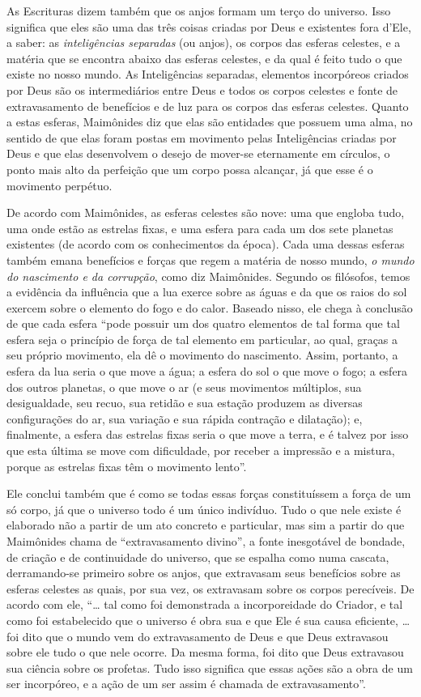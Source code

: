 As Escrituras dizem também que os anjos formam um terço do universo.
Isso significa que eles são uma das três coisas criadas por Deus e
existentes fora d'Ele, a saber: as \emph{inteligências separadas} (ou anjos),
os corpos das esferas celestes, e a matéria que se encontra abaixo das
esferas celestes, e da qual é feito tudo o que existe no nosso mundo. As
Inteligências separadas, elementos incorpóreos criados por Deus são os
intermediários entre Deus e todos os corpos celestes e fonte de
extravasamento de benefícios e de luz para os corpos das esferas
celestes. Quanto a estas esferas, Maimônides diz que elas são entidades
que possuem uma alma, no sentido de que elas foram postas em movimento
pelas Inteligências criadas por Deus e que elas desenvolvem o desejo de
mover-se eternamente em círculos, o ponto mais alto da perfeição que um
corpo possa alcançar, já que esse é o movimento perpétuo.

De acordo com Maimônides, as esferas celestes são nove: uma
que engloba tudo, uma onde estão as estrelas fixas, e uma esfera para
cada um dos sete planetas existentes (de acordo com os conhecimentos da
época). Cada uma dessas esferas também emana benefícios e forças que
regem a matéria de nosso mundo, \emph{o mundo do nascimento e da
corrupção}, como diz Maimônides. Segundo os filósofos, temos a
evidência da influência que a lua exerce sobre as águas e da que os
raios do sol exercem sobre o elemento do fogo e do calor. Baseado
nisso, ele chega à conclusão de que cada esfera ``pode possuir um dos
quatro elementos de tal forma que tal esfera seja o princípio de força
de tal elemento em particular, ao qual, graças a seu próprio movimento,
ela dê o movimento do nascimento. Assim, portanto, a esfera da lua seria
o que move a água; a esfera do sol o que move o fogo; a esfera dos
outros planetas, o que move o ar (e seus movimentos múltiplos, sua
desigualdade, seu recuo, sua retidão e sua estação produzem as diversas
configurações do ar, sua variação e sua rápida contração e dilatação);
e, finalmente, a esfera das estrelas fixas seria o que move a terra, e é
talvez por isso que esta última se move com dificuldade, por receber a
impressão e a mistura, porque as estrelas fixas têm o movimento
lento''.

Ele conclui também que é como se todas essas forças constituíssem a
força de um só corpo, já que o universo todo é um único indivíduo. Tudo
o que nele existe é elaborado não a partir de um ato concreto e
particular, mas sim a partir do que Maimônides chama de ``extravasamento
divino'', a fonte inesgotável de bondade, de criação e de continuidade
do universo, que se espalha como numa cascata, derramando-se primeiro
sobre os anjos, que extravasam seus benefícios sobre as esferas
celestes as quais, por sua vez, os extravasam sobre os corpos
perecíveis. De acordo com ele, ``\ldots{} tal como foi demonstrada a
incorporeidade do Criador, e tal como foi estabelecido que o universo é
obra sua e que Ele é sua causa eficiente, \ldots{} foi dito que o mundo vem
do extravasamento de Deus e que Deus extravasou sobre ele tudo o que
nele ocorre. Da mesma forma, foi dito que Deus extravasou sua ciência
sobre os profetas. Tudo isso significa que essas ações são a obra de um
ser incorpóreo, e a ação de um ser assim é chamada de extravasamento''.

